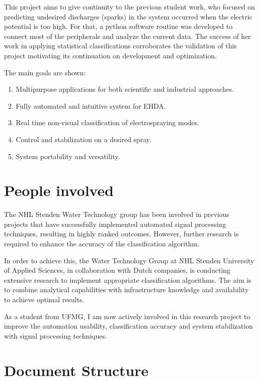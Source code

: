 This project aims to give continuity to the previous student work\cite{Monica}, who focused on predicting undesired discharges (sparks) in the system occurred when the electric potential is too high. 
For that, a python software routine was developed to connect most of the peripherals and analyze the current data.
The success of her work in applying statistical classifications corroborates the validation of this project motivating its continuation on development and optimization.

The main goals are shown:

\begin{enumerate}[]
\item Multipurpose applications for both scientific and industrial approaches.
\item Fully automated and intuitive system for EHDA.
\item Real time non-visual classification of electrospraying modes.
\item Control and stabilization on a desired spray. 
\item System portability and versatility.
\end{enumerate}


\section{People involved}
\label{sec:companies}

The NHL Stenden Water Technology group has been involved in previous projects that have successfully implemented automated signal processing techniques, resulting in highly ranked outcomes. 
However, further research is required to enhance the accuracy of the classification algorithm. 

In order to achieve this, the Water Technology Group at NHL Stenden University of Applied Sciences, in collaboration with Dutch companies, is conducting extensive research to implement appropriate classification algorithms. The aim is to combine analytical capabilities with infrastructure knowledge and availability to achieve optimal results.

As a student from UFMG, I am now actively involved in this research project to improve the automation usability, classification accuracy and system stabilization with signal processing techniques.

\section{Document Structure}
\label{sec:doc_struct}

